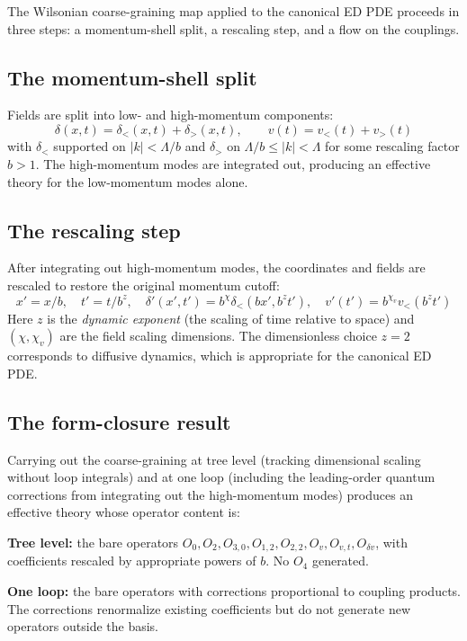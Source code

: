 \documentclass[11pt,a4paper]{article}
\begin{document}
The Wilsonian coarse-graining map applied to the canonical ED PDE proceeds in three steps: a momentum-shell split, a rescaling step, and a flow on the couplings.

\subsection{The momentum-shell split}

Fields are split into low- and high-momentum components:
\[
\delta(x, t) = \delta_<(x, t) + \delta_>(x, t), \qquad v(t) = v_<(t) + v_>(t)
\]
with $\delta_<$ supported on $|k| < \Lambda/b$ and $\delta_>$ on $\Lambda/b \leq |k| < \Lambda$ for some rescaling factor $b > 1$. The high-momentum modes are integrated out, producing an effective theory for the low-momentum modes alone.

\subsection{The rescaling step}

After integrating out high-momentum modes, the coordinates and fields are rescaled to restore the original momentum cutoff:
\[
x' = x/b, \quad t' = t/b^z, \quad \delta'(x', t') = b^\chi \delta_<(bx', b^z t'), \quad v'(t') = b^{\chi_v} v_<(b^z t')
\]
Here $z$ is the \emph{dynamic exponent} (the scaling of time relative to space) and $(\chi, \chi_v)$ are the field scaling dimensions. The dimensionless choice $z = 2$ corresponds to diffusive dynamics, which is appropriate for the canonical ED PDE.

\subsection{The form-closure result}

Carrying out the coarse-graining at tree level (tracking dimensional scaling without loop integrals) and at one loop (including the leading-order quantum corrections from integrating out the high-momentum modes) produces an effective theory whose operator content is:

\textbf{Tree level:} the bare operators $O_0, O_2, O_{3,0}, O_{1,2}, O_{2,2}, O_v, O_{v,t}, O_{\delta v}$, with coefficients rescaled by appropriate powers of $b$. No $O_4$ generated.

\textbf{One loop:} the bare operators with corrections proportional to coupling products. The corrections renormalize existing coefficients but do not generate new operators outside the basis.
\end{document}
